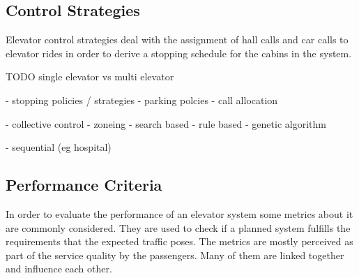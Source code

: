 

\subsection{Control Strategies}
\label{sec:sota:strategies}

Elevator control strategies deal with the assignment of hall calls and car calls to elevator rides in order to derive a stopping schedule for the cabins in the system.



TODO
single elevator  vs multi elevator

\autocite[][pp.~3--4,10]{beers2015arrivals}
- stopping policies / strategies
- parking polcies
- call allocation

\autocite[][pp.~3--6]{axelsson2013strategies}
- collective control
- zoneing
- search based
- rule based
- genetic algorithm


- sequential (eg hospital)



\subsection{Performance Criteria}

In order to evaluate the performance of an elevator system some metrics about it are commonly considered.
They are used to check if a planned system fulfills the requirements that the expected traffic poses. 
The metrics are mostly perceived as part of the service quality by the passengers.
Many of them are linked together and influence each other.



